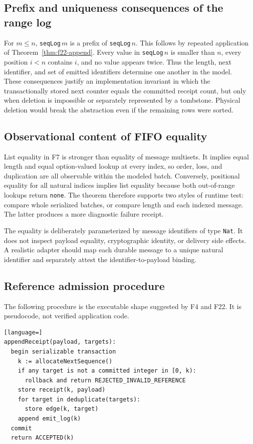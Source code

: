 \documentclass[11pt,letterpaper]{article}
\theoremstyle{definition}
\begin{document}
\subsection{Prefix and uniqueness consequences of the range log}

For $m\leq n$, \texttt{seqLog}$\,m$ is a prefix of
\texttt{seqLog}$\,n$. This follows by repeated application of
Theorem~\ref{thm:f22-append}. Every value in \texttt{seqLog}$\,n$ is smaller
than $n$, every position $i<n$ contains $i$, and no value appears twice. Thus
the length, next identifier, and set of emitted identifiers determine one
another in the model. These consequences justify an implementation invariant
in which the transactionally stored next counter equals the committed receipt
count, but only when deletion is impossible or separately represented by a
tombstone. Physical deletion would break the abstraction even if the remaining
rows were sorted.

\subsection{Observational content of FIFO equality}

List equality in F7 is stronger than equality of message multisets. It implies
equal length and equal option-valued lookup at every index, so order, loss, and
duplication are all observable within the modeled batch. Conversely,
positional equality for all natural indices implies list equality because both
out-of-range lookups return \texttt{none}. The theorem therefore supports two
styles of runtime test: compare whole serialized batches, or compare length and
each indexed message. The latter produces a more diagnostic failure receipt.

The equality is deliberately parameterized by message identifiers of type
\texttt{Nat}. It does not inspect payload equality, cryptographic identity, or
delivery side effects. A realistic adapter should map each durable message to a
unique natural identifier and separately attest the identifier-to-payload
binding.

\subsection{Reference admission procedure}

The following procedure is the executable shape suggested by F4 and F22. It is
pseudocode, not verified application code.

\begin{lstlisting}[language=]
appendReceipt(payload, targets):
  begin serializable transaction
    k := allocateNextSequence()
    if any target is not a committed integer in [0, k):
      rollback and return REJECTED_INVALID_REFERENCE
    store receipt(k, payload)
    for target in deduplicate(targets):
      store edge(k, target)
    append emit_log(k)
  commit
  return ACCEPTED(k)
\end{lstlisting}
\end{document}
